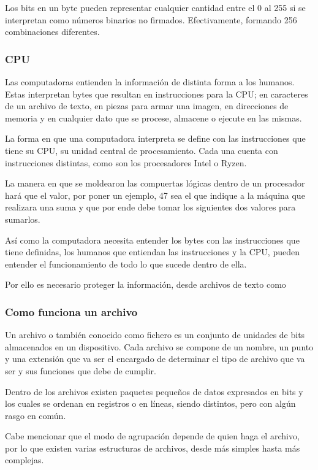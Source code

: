 \documentclass[a4paper]{article}
\begin{document}
Los bits en un byte pueden representar cualquier cantidad entre el 0 al 255 si
se interpretan como números binarios no firmados. Efectivamente, formando 256
combinaciones diferentes.

\subsubsection{CPU}

Las computadoras entienden la información de distinta forma a los humanos.
Estas interpretan bytes que resultan en instrucciones para la CPU; en
caracteres de
un archivo de texto, en piezas para armar una imagen, en direcciones de memoria
y en cualquier dato que se procese, almacene o ejecute en las mismas.

La forma en que una computadora interpreta se define con las instrucciones que
tiene su CPU, su unidad central de procesamiento.
Cada una cuenta con instrucciones distintas, como son los procesadores Intel o
Ryzen.

La manera en que se moldearon las compuertas lógicas dentro de un procesador
hará que el valor, por poner un ejemplo, 47 sea el que
indique a la máquina que realizara una suma y que por ende debe tomar los
siguientes dos valores para sumarlos.

Así como la computadora necesita entender los bytes con las instrucciones que
tiene definidas, los humanos que entiendan las instrucciones
y la CPU, pueden entender el funcionamiento de todo lo que sucede dentro de
ella.

Por ello es necesario proteger la información, desde archivos de texto como

\subsubsection{Como funciona un archivo}

Un archivo o también conocido como fichero es un conjunto de unidades de bits almacenados en un dispositivo. Cada archivo se compone de un nombre, un punto y una extensión que va ser el encargado de determinar el tipo de archivo que va ser y sus funciones que debe de cumplir. 


Dentro de los archivos existen paquetes pequeños de datos expresados en bits y los cuales se ordenan en registros o en líneas, siendo distintos, pero con algún rasgo en común.

Cabe mencionar que el modo de agrupación depende de quien haga el archivo, por lo que existen varias estructuras de archivos, desde más simples hasta más complejas.
\end{document}
